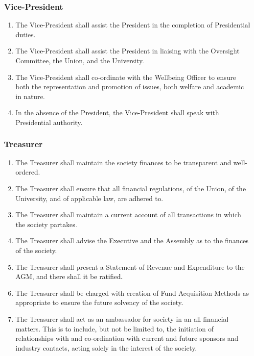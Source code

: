 \documentclass{scrartcl}
\begin{document}
            \subsubsection{Vice-President}
                \label{executive--positions--vice-president}
                \begin{enumerate}
                    \item The Vice-President shall assist the President in the completion of Presidential duties.
                    \item The Vice-President shall assist the President in liaising with the Oversight Committee, the Union, and the University.
                    \item The Vice-President shall co-ordinate with the Wellbeing Officer to ensure both the representation and promotion of issues, both welfare and academic in nature.
                    \item In the absence of the President, the Vice-President shall speak with Presidential authority.
                \end{enumerate}

            \subsubsection{Treasurer}
                \label{executive--positions--treasurer}
                \begin{enumerate}
                    \item The Treasurer shall maintain the society finances to be transparent and well-ordered.
                    \item The Treasurer shall ensure that all financial regulations, of the Union, of the University, and of applicable law, are adhered to.
                    \item The Treasurer shall maintain a current account of all transactions in which the society partakes.
                    \item The Treasurer shall advise the Executive and the Assembly as to the finances of the society.
                    \item The Treasurer shall present a Statement of Revenue and Expenditure to the AGM, and there shall it be ratified.
                    \item The Treasurer shall be charged with creation of Fund Acquisition Methods as appropriate to ensure the future solvency of the society.
                    \item The Treasurer shall act as an ambassador for society in an all financial matters. This is to include, but not be limited to, the initiation of relationships with and co-ordination with current and future sponsors and industry contacts, acting solely in the interest of the society.
                \end{enumerate}
\end{document}
